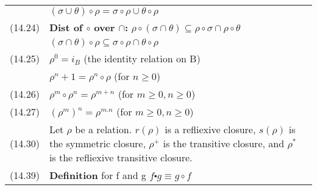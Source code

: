 \documentclass[letterpaper, 8pt]{extarticle}
\begin{document}
\begin{multicols*}{3}
\begin{tabulary}{\linewidth}{@{}lLL@{}}
        &  $(\sigma \cup \theta) \circ \rho = \sigma \circ \rho \cup \theta \circ \rho$&\\
        (14.24) & \textbf{Dist of $\circ$ over $\cap$:} \; $\rho \circ (\sigma \cap \theta) \subseteq \rho \circ \sigma \cap \rho \circ \theta$&\\
        &  $(\sigma \cap \theta) \circ \rho \subseteq \sigma \circ \rho \cap \theta \circ \rho$&\\
        (14.25) & $\rho^0 = i_B$ (the identity relation on B)\\
        &  $\rho^n+1 = \rho^n \circ \rho$ (for $n \geq 0$)&\\
        (14.26) & $\rho^m \circ \rho^n = \rho^{m+n}$ (for $m \geq 0,n \geq 0$) &\\
        (14.27) & $(\rho^m)^n = \rho^{m.n}$ (for $m \geq 0,n \geq 0$) &\\
        (14.30) &Let $\rho$ be a relation. $r(\rho)$ is a refliexive closure, $s(\rho)$ is the symmetric closure, $\rho^+$ is the transitive closure, and $\rho^*$ is the refliexive transitive closure.& \\
        (14.39) &\textbf{Definition} for f and g $f \centerdot g \equiv g \circ f$ &\\
    \end{tabulary}

    \clearpage


\end{multicols*}
\end{document}
